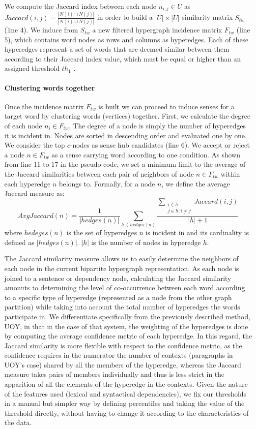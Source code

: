 We compute the Jaccard index between each node $n_{i,j} \in U$ as $Jaccard(i,j)=\frac{|N(i)\cap N(j)|}{|N(i)\cup N(j)|}$ in order to build a $|U|\times|U|$ similarity matrix $S_{tw}$ (line 4). We induce from $S_{tw}$ a new filtered  hypergraph incidence matrix $F_{tw}$ (line 5), which contains word nodes as rows and columns as hyperedges. Each of these hyperedges represent a set of words that are deemed similar between them according to their Jaccard  index value, which must be equal or higher than an assigned threshold $th_1$ .  

\paragraph{Clustering words  together}
Once the incidence matrix $F_{tw}$ is built we can proceed to induce senses for a target word by clustering words (vertices) together. First, we calculate the degree of each node $n_i \in F_{tw}$. The degree of a node is simply the number of hyperedges it is incident in. Nodes are sorted in descending order and evaluated one by one. We consider the top $c$-nodes as sense hub candidates (line 6). We accept or reject a node $n \in F_{tw}$ as a sense carrying word according to one condition. As shown from line 11 to 17 in the pseudo-code, we set a minimum limit to the average of the Jaccard similarities between each pair of neighbors of node $n \in F_{tw}$ within each hyperedge  $n$ belongs to. Formally, for a node $n$, we define the average Jaccard measure as: $$AvgJaccard(n)=\frac{1}{|hedges(n)|}\sum_{h\in hedges(n)}\frac{\sum_{\substack{i\in h\\j\in h;i\neq j}}Jaccard(i,j)}{|h| + 1}$$ 
where $hedeges(n)$ is the set of hyperedges $n$ is incident in and its cardinality is defined as $|hedges(n)|$. $|h|$ is the number of nodes in hyperedge $h$. 

The Jaccard similarity measure allows us to easily determine the neighbors of each node in the current bipartite hypergraph representation. As each node is joined to a sentence or dependency node, calculating the Jaccard similarity amounts to determining the level of co-occurrence between each word according to a specific type of hyperedge (represented as a node from the other graph partition) while taking into account the total number of hyperedges the words participate in. We differentiate specifically from the previously described method, UOY, in that in the case of that system, the weighting of the hyperedges is done by computing the average confidence metric of each hyperedge. In this regard, the Jaccard similarity is more flexible with respect to the confidence metric, as the confidence requires in the numerator the number of contexts (paragraphs in UOY's case) shared by all the members of the hyperedge, whereas the Jaccard measure takes pairs of members individually and thus is less strict in the apparition of all the elements of the hyperedge in the contexts. Given the nature of the features used (lexical and syntactical dependencies), we fix our thresholds in a manual but simpler way by defining percentiles and taking the value of the threshold directly, without having to change it according to the characteristics of the data.

